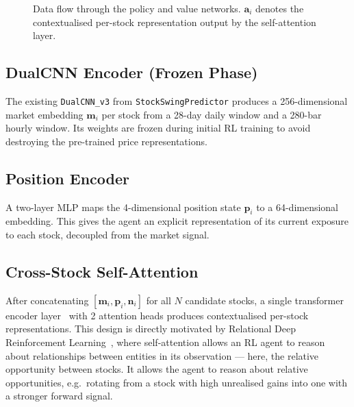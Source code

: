 \documentclass[11pt, a4paper]{article}
\begin{document}
\begin{figure}[ht]
\caption{Data flow through the policy and value networks. $\mathbf{a}_i$
         denotes the contextualised per-stock representation output by the
         self-attention layer.}
\label{fig:arch}
\end{figure}

\subsection{DualCNN Encoder (Frozen Phase)}

The existing \texttt{DualCNN\_v3} from \texttt{StockSwingPredictor} produces
a 256-dimensional market embedding $\mathbf{m}_i$ per stock from a 28-day
daily window and a 280-bar hourly window. Its weights are frozen during
initial RL training to avoid destroying the pre-trained price
representations.

\subsection{Position Encoder}

A two-layer MLP maps the 4-dimensional position state $\mathbf{p}_i$ to a
64-dimensional embedding. This gives the agent an explicit representation of
its current exposure to each stock, decoupled from the market signal.

\subsection{Cross-Stock Self-Attention}

After concatenating $[\mathbf{m}_i, \mathbf{p}_i, \mathbf{n}_i]$ for all $N$
candidate stocks, a single transformer encoder layer~\cite{vaswani2017attention}
with 2 attention heads produces contextualised per-stock representations.
This design is directly motivated by Relational Deep Reinforcement
Learning~\cite{zambaldi2018relational}, where self-attention allows an RL
agent to reason about relationships between entities in its observation —
here, the relative opportunity between stocks. It allows the agent to reason
about relative opportunities, e.g.\ rotating from a stock with high
unrealised gains into one with a stronger forward signal.
\end{document}
